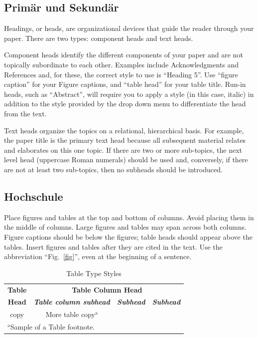 \documentclass[conference]{IEEEtran}
\begin{document}
\subsection{Primär und Sekundär}
Headings, or heads, are organizational devices that guide the reader through 
your paper. There are two types: component heads and text heads.

Component heads identify the different components of your paper and are not 
topically subordinate to each other. Examples include Acknowledgments and 
References and, for these, the correct style to use is ``Heading 5''. Use 
``figure caption'' for your Figure captions, and ``table head'' for your 
table title. Run-in heads, such as ``Abstract'', will require you to apply a 
style (in this case, italic) in addition to the style provided by the drop 
down menu to differentiate the head from the text.

Text heads organize the topics on a relational, hierarchical basis. For 
example, the paper title is the primary text head because all subsequent 
material relates and elaborates on this one topic. If there are two or more 
sub-topics, the next level head (uppercase Roman numerals) should be used 
and, conversely, if there are not at least two sub-topics, then no subheads 
should be introduced.

\subsection{Hochschule}
Place figures and tables at the top and 
bottom of columns. Avoid placing them in the middle of columns. Large 
figures and tables may span across both columns. Figure captions should be 
below the figures; table heads should appear above the tables. Insert 
figures and tables after they are cited in the text. Use the abbreviation 
``Fig.~\ref{fig}'', even at the beginning of a sentence.

\begin{table}[htbp]
\caption{Table Type Styles}
\begin{center}
\begin{tabular}{|c|c|c|c|}
\hline
\textbf{Table}&\multicolumn{3}{|c|}{\textbf{Table Column Head}} \\
\cline{2-4} 
\textbf{Head} & \textbf{\textit{Table column subhead}}& \textbf{\textit{Subhead}}& \textbf{\textit{Subhead}} \\
\hline
copy& More table copy$^{\mathrm{a}}$& &  \\
\hline
\multicolumn{4}{l}{$^{\mathrm{a}}$Sample of a Table footnote.}
\end{tabular}
\label{tab1}
\end{center}
\end{table}
\end{document}
